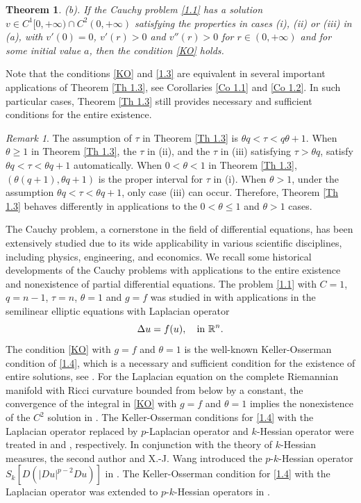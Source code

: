 \documentclass[a4paper,11pt]{amsart}
\theoremstyle{plain}
\newtheorem{Theorem}{Theorem}[section]
\theoremstyle{remark}
\newtheorem{remark}{Remark}
\numberwithin{equation}{section}
\numberwithin{figure}{section}
\numberwithin{remark}{section}
\begin{document}
\begin{sloppypar}
\begin{Theorem}
(b). If the Cauchy problem \eqref{1.1} has a solution $v \in C^1[0, +\infty)\cap C^2(0, +\infty)$ satisfying the properties in cases (i), (ii) or (iii) in (a), with $v'(0)=0$, $v'(r)>0$ and $v''(r)>0$ for $r\in (0, +\infty)$ and for some initial value $a$, then the condition \eqref{KO} holds.
\end{Theorem}

Note that the conditions \eqref{KO} and \eqref{1.3} are equivalent in several important applications of Theorem \ref{Th 1.3}, see Corollaries \ref{Co 1.1} and \eqref{Co 1.2}. In such particular cases, Theorem \ref{Th 1.3} still provides necessary and sufficient conditions for the entire existence.

\begin{remark}\label{Remark 1.2}
The assumption of $\tau$ in Theorem \ref{Th 1.3} is $\theta q< \tau < q\theta+1$. 
When $\theta \ge 1$ in Theorem \ref{Th 1.3}, the $\tau$ in (ii), and the $\tau$ in (iii) satisfying $\tau>\theta q$, satisfy $\theta q<\tau < \theta q+1$ automatically. When $0<\theta <1$ in Theorem \ref{Th 1.3}, $(\theta (q+1), \theta q+1)$ is the proper interval for $\tau$ in (i). When $\theta>1$, under the assumption $\theta q<\tau < \theta q+1$, only case (iii) can occur. Therefore, Theorem \ref{Th 1.3} behaves differently in applications to the $0<\theta \le 1$ and $\theta > 1$ cases.
\end{remark}


The Cauchy problem, a cornerstone in the field of differential equations, has been extensively studied due to its wide applicability in various scientific disciplines, including physics, engineering, and economics. We recall some historical developments of the Cauchy problems with applications to the entire existence and nonexistence of partial differential equations. The problem \eqref{1.1} with $C=1$, $q=n-1$, $\tau=n$, $\theta=1$ and $g=f$ was studied in \cite{K1957} with applications in the semilinear elliptic equations with Laplacian operator
\begin{equation}\label{1.4}
\Delta u = f(u), \quad {\rm in} \ \mathbb{R}^n. 
\end{equation}
The condition \eqref{KO} with $g=f$ and $\theta =1$ is the well-known Keller-Osserman condition of \eqref{1.4}, which is a necessary and sufficient condition for the existence of entire solutions, see \cite{K1957, O1957}. For the Laplacian equation on the complete Riemannian manifold with Ricci curvature bounded from below by a constant, the convergence of the integral in \eqref{KO} with $g=f$ and $\theta =1$ implies the nonexistence of the $C^2$ solution in \cite{CY1975}. The Keller-Osserman conditions for \eqref{1.4} with the Laplacian operator replaced by $p$-Laplacian operator and $k$-Hessian operator were treated in \cite{NU1997} and \cite{JB2010}, respectively. In conjunction with the theory of  $k$-Hessian measures, the second author and X.-J. Wang introduced the $p$-$k$-Hessian operator $S_k[D(|Du|^{p-2}Du)]$ in \cite{TW1999}. The Keller-Osserman condition for \eqref{1.4} with the Laplacian operator was extended to $p$-$k$-Hessian operators in \cite{BF2022}.


\end{sloppypar}
\end{document}
